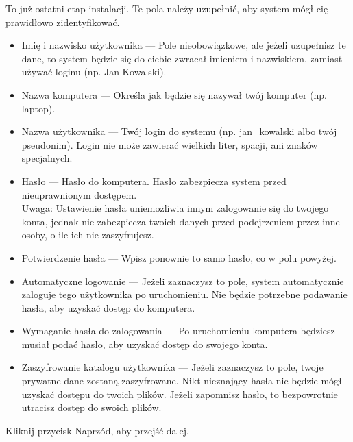 To już ostatni etap instalacji. Te pola należy uzupełnić, aby system mógł cię prawidłowo zidentyfikować.
\begin{itemize}
\item \textcolor{ubuntu_orange}{Imię i nazwisko użytkownika} --- Pole nieobowiązkowe, ale jeżeli uzupełnisz te dane, to system będzie się do ciebie zwracał imieniem i nazwiskiem, zamiast używać loginu (np. Jan Kowalski).
\item \textcolor{ubuntu_orange}{Nazwa komputera} --- Określa jak będzie się nazywał twój komputer (np. laptop).
\item \textcolor{ubuntu_orange}{Nazwa użytkownika} --- Twój login do systemu (np. jan\_kowalski albo twój pseudonim). Login nie może zawierać wielkich liter, spacji, ani znaków specjalnych.
\item \textcolor{ubuntu_orange}{Hasło} --- Hasło do komputera. Hasło zabezpiecza system przed nieuprawnionym dostępem.\\
Uwaga: Ustawienie hasła uniemożliwia innym zalogowanie się do twojego konta, jednak nie zabezpiecza twoich danych przed podejrzeniem przez inne osoby, o ile ich nie zaszyfrujesz. 
\item \textcolor{ubuntu_orange}{Potwierdzenie hasła} --- Wpisz ponownie to samo hasło, co w polu powyżej.
\item \textcolor{ubuntu_orange}{Automatyczne logowanie} --- Jeżeli zaznaczysz to pole, system automatycznie zaloguje tego użytkownika po uruchomieniu. Nie będzie potrzebne podawanie hasła, aby uzyskać dostęp do komputera.
\item \textcolor{ubuntu_orange}{Wymaganie hasła do zalogowania} --- Po uruchomieniu komputera będziesz musiał podać hasło, aby uzyskać dostęp do swojego konta.
\item \textcolor{ubuntu_orange}{Zaszyfrowanie katalogu użytkownika} --- Jeżeli zaznaczysz to pole, twoje prywatne dane zostaną zaszyfrowane. Nikt nieznający hasła nie będzie mógł uzyskać dostępu do twoich plików. Jeżeli zapomnisz hasło, to bezpowrotnie utracisz dostęp do swoich plików.
\end{itemize}
\begin{flushright}
Kliknij przycisk \textcolor{ubuntu_orange}{Naprzód}, aby przejść dalej.
\end{flushright}
\clearpage
